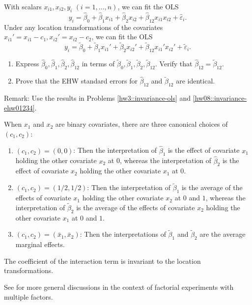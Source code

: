 With scalars $x_{i1}, x_{i2}, y_i$ $(i=1,\ldots, n)$, we can fit the OLS
$$
y_i = \hat{\beta}_0  + \hat{\beta}_1 x_{i1}  +  \hat{\beta}_2 x_{i2} + \hat{\beta}_{12} x_{i1}  x_{i2}  + \hat{\varepsilon}_i.
$$
Under any location transformations of the covariates $  x_{i1}' =x_{i1}  -c_1 , x_{i2} ' = x_{i2} - c_2$, we can fit the OLS
$$
y_i = \tilde{\beta}_0  + \tilde{\beta}_1 x_{i1}'  +  \tilde{\beta}_2 x_{i2}' + \tilde{\beta}_{12} x_{i1} ' x_{i2}'  + \tilde{\varepsilon}_i.
$$

\begin{enumerate}
\item
Express $\hat{\beta}_0, \hat{\beta}_1, \hat{\beta}_2, \hat{\beta}_{12}$ in terms of $\tilde{\beta}_0 , \tilde{\beta}_1, \tilde{\beta}_2, \tilde{\beta}_{12}$. Verify that $\hat{\beta}_{12} = \tilde{\beta}_{12} .$

\item
Prove that the EHW standard errors for $\hat{\beta}_{12}$ and $\tilde{\beta}_{12} $ are identical.
\end{enumerate}

Remark: Use the results in Problems \ref{hw3::invariance-ols} and \ref{hw08::invariance-ehw01234}. 
 
 
When $x_1$ and $x_2$ are binary covariates, there are three canonical choices of $(c_1, c_2)$:
\begin{enumerate}[label=(C\arabic*), ref=C\arabic*]
\item
$(c_1, c_2) = (0, 0)$: Then the interpretation of $\hat{\beta}_1$  is the effect of covariate $x_1$ holding the other covariate $x_2$ at 0, whereas the interpretation of $\hat{\beta}_2$ is the  effect of covariate $x_2$ holding the other covariate $x_1$ at 0.

\item
$(c_1, c_2) = (1/2, 1/2)$: Then the interpretation of $\tilde{\beta}_1$  is the average of the effects of covariate $x_1$ holding the other covariate $x_2$ at $0$ and $1$, whereas the interpretation of $\tilde{\beta}_2$  is the average of the effects of covariate $x_2$ holding the other covariate $x_1$ at $0$ and $1$.
 


\item
$(c_1, c_2) = (\bar{x}_1, \bar{x}_2)$: Then the interpretations of $\tilde{\beta}_1$ and $\tilde{\beta}_2$ are the average marginal effects. 
\end{enumerate} 
The coefficient of the interaction term is invariant to the  location transformations. 

See \citet{zhao2021regression} for more general discussions in the context of factorial experiments with multiple factors. 
 
 
 
 
